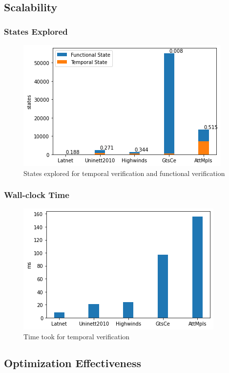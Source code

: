 \documentclass[10pt,sigconf,letterpaper,anonymous,nonacm]{acmart}
\begin{document}
\subsection{Scalability}

\subsubsection{States Explored}
\begin{figure}[h]
    \centering
    \includegraphics[scale=0.5]{states}
    \caption{States explored for temporal verification and functional verification}
    \label{fig:states}
\end{figure}

\subsubsection{Wall-clock Time}
\begin{figure}[h]
    \centering
    \includegraphics[scale=0.5]{wallclock}
    \caption{Time took for temporal verification}
    \label{fig:wallclock}
\end{figure}

\subsection{Optimization Effectiveness}
\end{document}
